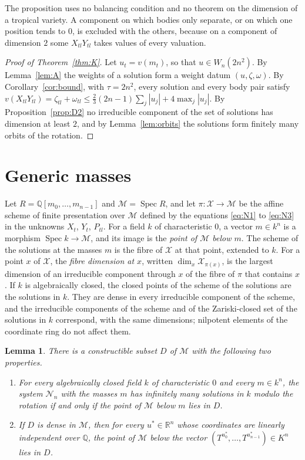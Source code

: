 \documentclass[11pt]{amsart}
\newtheorem{lemma}[theorem]{Lemma}
\theoremstyle{definition}
\theoremstyle{remark}
\numberwithin{equation}{section}
\newcommand{\QQ}{\mathbb{Q}}
\newcommand{\RR}{\mathbb{R}}
\newcommand{\cN}{\mathcal{N}}
\newcommand{\cX}{\mathcal{X}}
\newcommand{\cM}{\mathcal{M}}
\DeclareMathOperator{\Spec}{Spec}
\begin{document}
The proposition uses no balancing condition and no theorem on the dimension of a tropical variety. A
component on which bodies only separate, or on which one position tends to $0$, is excluded with the
others, because on a component of dimension $2$ some $X_{tl} Y_{tl}$ takes values of every valuation.

\begin{proof}[Proof of Theorem~\ref{thm:K}]
Let $u_t = v(m_t)$, so that $u \in W_n(2n^2)$. By Lemma~\ref{lem:A} the weights of a solution form a
weight datum $(u, \zeta, \omega)$. By Corollary~\ref{cor:bound}, with $\tau = 2n^2$, every solution and
every body pair satisfy
$v(X_{tl} Y_{tl}) = \zeta_{tl} + \omega_{tl} \le \tfrac23 (2n - 1) \sum_j |u_j| + 4 \max_j |u_j|$. By
Proposition~\ref{prop:D2} no irreducible component of the set of solutions has dimension at least $2$,
and by Lemma~\ref{lem:orbits} the solutions form finitely many orbits of the rotation.
\end{proof}

\section{Generic masses}\label{sec:generic}

Let $R = \QQ[m_0, \dots, m_{n-1}]$ and $\cM = \Spec R$, and let $\pi \colon \cX \to \cM$ be the affine
scheme of finite presentation over $\cM$ defined by the equations \eqref{eq:N1} to \eqref{eq:N3} in the
unknowns $X_t$, $Y_t$, $P_{tl}$. For a field $k$ of characteristic $0$, a vector $m \in k^n$ is a
morphism $\Spec k \to \cM$, and its image is the \emph{point of $\cM$ below $m$}. The scheme of the
solutions at the masses $m$ is the fibre of $\cX$ at that point, extended to $k$. For a point $x$ of
$\cX$, the \emph{fibre dimension at $x$}, written $\dim_x \cX_{\pi(x)}$, is the largest dimension of an
irreducible component through $x$ of the fibre of $\pi$ that contains $x$. If $k$ is algebraically
closed, the closed points of the scheme of the solutions are the solutions in $k$. They are dense in
every irreducible component of the scheme, and the irreducible components of the scheme and of the
Zariski-closed set of the solutions in $k$ correspond, with the same dimensions; nilpotent elements of
the coordinate ring do not affect them.

\begin{lemma}\label{lem:D0}
There is a constructible subset $D$ of $\cM$ with the following two properties.
\begin{enumerate}
\item[(a)] For every algebraically closed field $k$ of characteristic $0$ and every $m \in k^n$, the
system $\cN_n$ with the masses $m$ has infinitely many solutions in $k$ modulo the rotation if and only
if the point of $\cM$ below $m$ lies in $D$.
\item[(b)] If $D$ is dense in $\cM$, then for every $u^{*} \in \RR^n$ whose coordinates are linearly
independent over $\QQ$, the point of $\cM$ below the vector
$(T^{u^{*}_0}, \dots, T^{u^{*}_{n-1}}) \in K^n$ lies in $D$.
\end{enumerate}
\end{lemma}
\end{document}
